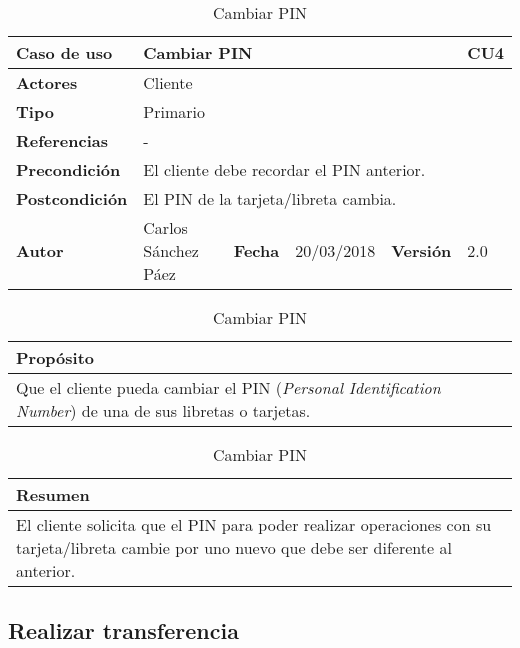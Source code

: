 \documentclass[12pt,spanish]{article}
\begin{document}
\begin{table}[H]
\centering
\begin{tabular}{|m{3cm}|m{4cm}|m{2cm}|m{2cm}|m{2cm}|m{1cm}|}
\hline
\textbf{Caso de uso} &  \multicolumn{4}{m{8cm}|}{Cambiar PIN} \vline &  \cellcolor{gray!40}CU4 \\
\hline
\textbf{Actores} & \multicolumn{5}{m{8cm}|}{Cliente} \\
\hline
\textbf{Tipo} & \multicolumn{5}{m{8cm}|}{Primario} \\
\hline
\textbf{Referencias} &\multicolumn{5}{m{8cm}|}{-} \\
\hline
\textbf{Precondición} & \multicolumn{5}{m{8cm}|}{El cliente debe recordar el PIN anterior.} \\
\hline
\textbf{Postcondición} & \multicolumn{5}{m{8cm}|}{El PIN de la tarjeta/libreta cambia.} \\
\hline
\textbf{Autor} & Carlos Sánchez Páez & \textbf{Fecha} & 20/03/2018 & \textbf{Versión} & 2.0 \\
\hline
\end{tabular}

\vspace{1cm}

\begin{tabular}{|m{16.2cm}|}
\hline
\textbf{Propósito} \\
\hline
Que el cliente pueda cambiar el PIN (\emph{Personal Identification Number}) de una de sus libretas o tarjetas. \\
\hline
\end{tabular}

\vspace{1cm}

\begin{tabular}{|m{16.2cm}|}
\hline
\textbf{Resumen} \\
\hline
El cliente solicita que el PIN para poder realizar operaciones con su tarjeta/libreta cambie por uno nuevo que debe ser diferente al anterior. \\
\hline
\end{tabular}

\caption{Cambiar PIN}

\end{table}


\subsection{Realizar transferencia}
\end{document}
